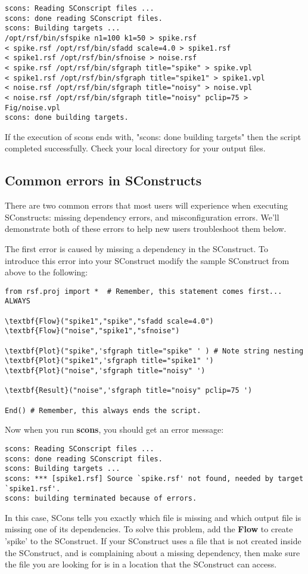 \begin{verbatim}
scons: Reading SConscript files ...
scons: done reading SConscript files.
scons: Building targets ...
/opt/rsf/bin/sfspike n1=100 k1=50 > spike.rsf
< spike.rsf /opt/rsf/bin/sfadd scale=4.0 > spike1.rsf
< spike1.rsf /opt/rsf/bin/sfnoise > noise.rsf
< spike.rsf /opt/rsf/bin/sfgraph title="spike" > spike.vpl
< spike1.rsf /opt/rsf/bin/sfgraph title="spike1" > spike1.vpl
< noise.rsf /opt/rsf/bin/sfgraph title="noisy" > noise.vpl
< noise.rsf /opt/rsf/bin/sfgraph title="noisy" pclip=75 > Fig/noise.vpl
scons: done building targets.
\end{verbatim}

If the execution of scons ends with, "scons: done building targets" then the script completed successfully.  Check your local directory for your output files. 

\subsection{Common errors in SConstructs}
There are two common errors that most users will experience when executing SConstructs: missing dependency errors, and misconfiguration errors.  We'll demonstrate both of these errors to help new users troubleshoot them below. 

 The first error is caused by missing a dependency in the SConstruct.  To introduce this error into your SConstruct modify the sample SConstruct from above to the following:

\begin{verbatim}
from rsf.proj import *  # Remember, this statement comes first... ALWAYS

\textbf{Flow}("spike1","spike","sfadd scale=4.0")
\textbf{Flow}("noise","spike1","sfnoise")

\textbf{Plot}("spike",'sfgraph title="spike" ' ) # Note string nesting
\textbf{Plot}("spike1",'sfgraph title="spike1" ') 
\textbf{Plot}("noise",'sfgraph title="noisy" ')

\textbf{Result}("noise",'sfgraph title="noisy" pclip=75 ')

End() # Remember, this always ends the script.
\end{verbatim}
Now when you run \textbf{scons}, you should get an error message:
\begin{verbatim}
scons: Reading SConscript files ...
scons: done reading SConscript files.
scons: Building targets ...
scons: *** [spike1.rsf] Source `spike.rsf' not found, needed by target `spike1.rsf'.
scons: building terminated because of errors.
\end{verbatim}
In this case, SCons tells you exactly which file is missing and which output file is missing one of its dependencies.  To solve this problem, add the \textbf{Flow} to create 'spike' to the SConstruct.  If your SConstruct uses a file that is not created inside the SConstruct, and is complaining about a missing dependency, then make sure the file you are looking for is in a location that the SConstruct can access.

